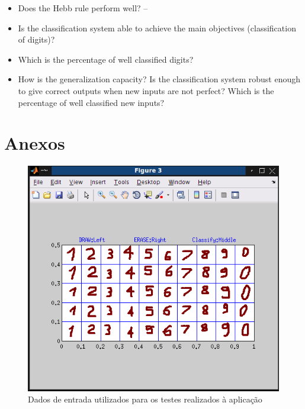 \documentclass{article}
\begin{document}
\begin{itemize}
\item Does the Hebb rule perform well? --

\item Is the classification system able to achieve the main objectives (classification of digits)?

\item Which is the percentage of well classified digits?

\item How is the generalization capacity? Is the classification system robust enough to give correct outputs when new inputs are not perfect? Which is the percentage of well classified new inputs?
\end{itemize}

\pagebreak

\section{Anexos}

\begin{figure}[h]
  \centering
      \includegraphics[scale=0.3]{Input.png}
  \caption{Dados de entrada utilizados para os testes realizados à aplicação}
\end{figure}
\end{document}
